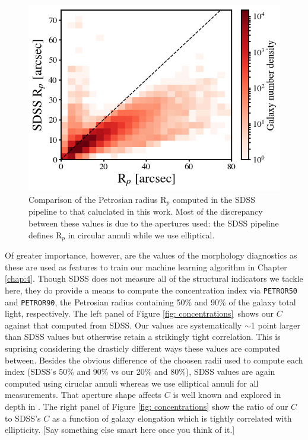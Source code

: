 \begin{figure}
\centering
\includegraphics[width=5in]{Figures/PetroRad_compare_cleanSample_forThesis.png}
\caption[Comparison of Petrosian radius from this work to that computed in SDSS pipeline]{Comparison of the Petrosian radius R$_p$ computed in the SDSS pipeline to that caluclated in this work. Most of the discrepancy between these values is due to the apertures used: the SDSS pipeline defines R$_p$ in circular annuli while we use elliptical.}
\label{fig: Rp comparison}
\end{figure}

Of greater importance, however, are the values of the morphology diagnostics as these are used as features to train our machine learning algorithm in Chapter \ref{chap:4}. Though SDSS does not measure all of the structural indicators we tackle here, they do provide a means to compute the concentration index via \texttt{PETROR50} and \texttt{PETROR90}, the Petrosian radius containing 50\% and 90\% of the galaxy total light, respectively. The left panel of Figure \ref{fig: concentrations}~shows our $C$ against that computed from SDSS. Our values are systematically $\sim$1 point larger than SDSS values but otherwise retain a strikingly tight correlation. This is suprising considering the drasticly different ways these values are computed between. Besides the obvious difference of the choosen radii used to compute each index (SDSS's 50\% and 90\% vs our 20\% and 80\%), SDSS values are again computed using ciruclar annuli whereas we use elliptical annuli for all measurements. That aperture shape affects $C$ is well known and explored in depth in \cite{Bershady2000}. The right panel of Figure \ref{fig: concentrations} show the ratio of our $C$ to SDSS's $C$ as a function of galaxy elongation which is tightly correlated with ellipticity. [Say something else smart here once you think of it.]


